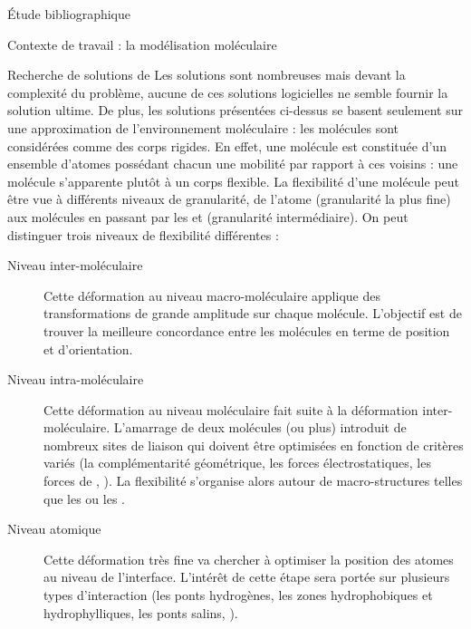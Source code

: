 \documentclass[myfrancais,ngerman,english,frenchb]{mythesis}
\begin{document}
\begin{mychapter}{Étude bibliographique}
\begin{mysection}{Contexte de travail : la modélisation moléculaire}
\begin{mysubsection}{Recherche de solutions de }
				Les solutions sont nombreuses mais devant la complexité du problème, aucune de ces solutions logicielles ne semble fournir la solution ultime.
				De plus, les solutions présentées ci-dessus se basent seulement sur une approximation de l'environnement moléculaire : les molécules sont considérées comme des corps rigides.
				En effet, une molécule est constituée d'un ensemble d'atomes possédant chacun une mobilité par rapport à ces voisins : une molécule s'apparente plutôt à un corps flexible.
				La flexibilité d'une molécule peut être vue à différents niveaux de granularité, de l'atome (granularité la plus fine) aux molécules en passant par les \myhelice* et \myfeuillet* (granularité intermédiaire).
				On peut distinguer trois niveaux de flexibilité différentes :
				\begin{description}
					\item[Niveau inter-moléculaire] Cette déformation au niveau macro-moléculaire applique des transformations de grande amplitude sur chaque molécule.
						L'objectif est de trouver la meilleure concordance entre les molécules en terme de position et d'orientation.
					\item[Niveau intra-moléculaire] Cette déformation au niveau moléculaire fait suite à la déformation inter-moléculaire.
						L'amarrage de deux molécules (ou plus) introduit de nombreux sites de liaison qui doivent être optimisées en fonction de critères variés (la complémentarité géométrique, les forces électrostatiques, les forces de  , \myetc).
						La flexibilité s'organise alors autour de macro-structures telles que les \myhelice* ou les \myfeuillet* {}.
					\item[Niveau atomique] Cette déformation très fine va chercher à optimiser la position des atomes au niveau de l'interface.
						L'intérêt de cette étape sera portée sur plusieurs types d'interaction (les ponts hydrogènes, les zones hydrophobiques et hydrophylliques, les ponts salins, \myetc).
				\end{description}

				\begin{myfigure}
				\end{myfigure}


\end{mysubsection}
\end{mysection}
\end{mychapter}
\end{document}
